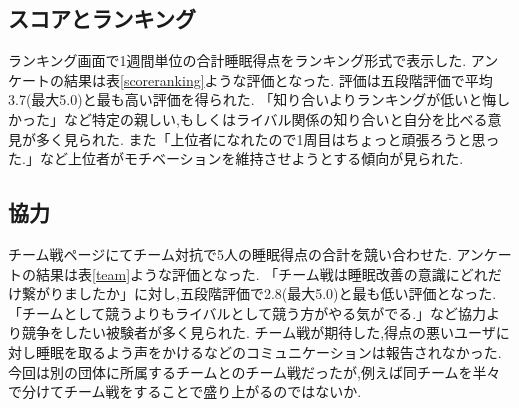 \subsection{スコアとランキング}
ランキング画面で1週間単位の合計睡眠得点をランキング形式で表示した.
アンケートの結果は表\ref{scoreranking}ような評価となった.
評価は五段階評価で平均3.7(最大5.0)と最も高い評価を得られた.
「知り合いよりランキングが低いと悔しかった」など特定の親しい,もしくはライバル関係の知り合いと自分を比べる意見が多く見られた.
また「上位者になれたので1周目はちょっと頑張ろうと思った.」など上位者がモチベーションを維持させようとする傾向が見られた.
\begin{table}[htbp]
	\begin{center}
 	\end{center}
 	\caption{最終アンケート:スコアとランキングについて}
 	\label{scoreranking}
\end{table}

\subsection{協力}
チーム戦ページにてチーム対抗で5人の睡眠得点の合計を競い合わせた.
アンケートの結果は表\ref{team}ような評価となった.
「チーム戦は睡眠改善の意識にどれだけ繋がりましたか」に対し,五段階評価で2.8(最大5.0)と最も低い評価となった.
「チームとして競うよりもライバルとして競う方がやる気がでる.」など協力より競争をしたい被験者が多く見られた.
チーム戦が期待した,得点の悪いユーザに対し睡眠を取るよう声をかけるなどのコミュニケーションは報告されなかった.
今回は別の団体に所属するチームとのチーム戦だったが,例えば同チームを半々で分けてチーム戦をすることで盛り上がるのではないか.

